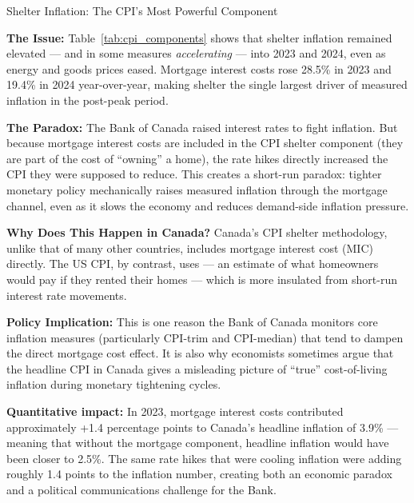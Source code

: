 \begin{casestudy}{Shelter Inflation: The CPI's Most Powerful Component}

\textbf{The Issue:} Table~\ref{tab:cpi_components} shows that shelter
inflation remained elevated --- and in some measures \textit{accelerating}
--- into 2023 and 2024, even as energy and goods prices eased. Mortgage
interest costs rose 28.5\% in 2023 and 19.4\% in 2024 year-over-year,
making shelter the single largest driver of measured inflation in the
post-peak period.

\textbf{The Paradox:} The Bank of Canada raised interest rates to fight
inflation. But because mortgage interest costs are included in the CPI
shelter component (they are part of the cost of ``owning'' a home),
the rate hikes directly increased the CPI they were supposed to reduce.
This creates a short-run paradox: tighter monetary policy mechanically
raises measured inflation through the mortgage channel, even as it slows
the economy and reduces demand-side inflation pressure.

\textbf{Why Does This Happen in Canada?}
Canada's CPI shelter methodology, unlike that of many other countries,
includes mortgage interest cost (MIC) directly. The US CPI, by contrast,
uses  --- an estimate of what homeowners
would pay if they rented their homes --- which is more insulated from
short-run interest rate movements.

\textbf{Policy Implication:} This is one reason the Bank of Canada
monitors core inflation measures (particularly CPI-trim and CPI-median)
that tend to dampen the direct mortgage cost effect. It is also why
economists sometimes argue that the headline CPI in Canada gives a
misleading picture of ``true'' cost-of-living inflation during monetary
tightening cycles.

\textbf{Quantitative impact:} In 2023, mortgage interest costs contributed
approximately +1.4 percentage points to Canada's headline inflation of 3.9\%
--- meaning that without the mortgage component, headline inflation would
have been closer to 2.5\%. The same rate hikes that were cooling inflation
were adding roughly 1.4 points to the inflation number, creating both
an economic paradox and a political communications challenge for the Bank.
\end{casestudy}

